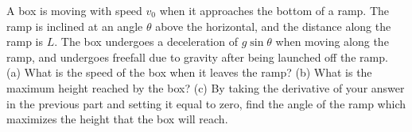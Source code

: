 A box is moving with speed $v_0$ when it approaches the bottom of a
ramp. The ramp is inclined at an angle $\theta$ above the horizontal,
and the distance along the ramp is $L$. The box undergoes a
deceleration of $g \sin \theta$ when moving along the ramp, and
undergoes freefall due to gravity after being launched off the ramp.\\
%
(a) What is the speed of the box when it leaves the ramp?\answercheck\hwendpart
%
(b) What is the maximum height reached by the box?\answercheck\hwendpart
%
(c) By taking the derivative of your answer in the previous part and
setting it equal to zero, find the angle of the ramp which maximizes
the height that the box will reach.\answercheck
